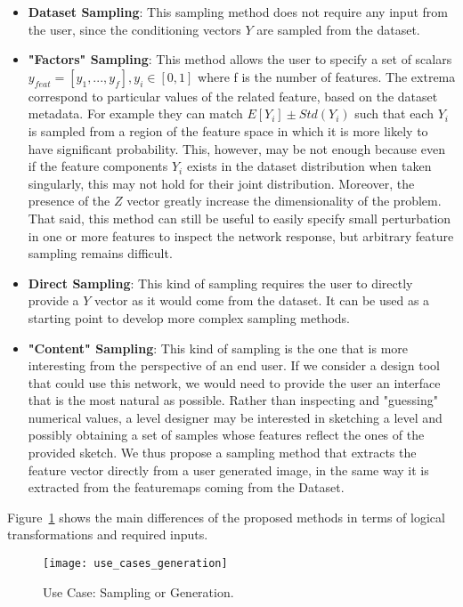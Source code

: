 \begin{itemize}
	\item \textbf{Dataset Sampling}: This sampling method does not require any input from the user, since the conditioning vectors $Y$ are sampled from the dataset.
	\item \textbf{"Factors" Sampling}: This method allows the user to specify a set of scalars $y_{feat} = [y_1, ..., y_f] , y_i \in [0,1]$ where f is the number of features. The extrema correspond to particular values of the related feature, based on the dataset metadata. For example they can match $E[Y_{i}] \pm Std(Y_{i})$ such that each $Y_{i}$ is sampled from a region of the feature space in which it is more likely to have significant probability. This, however, may be not enough because even if the feature components $Y_{i}$ exists in the dataset distribution when taken singularly, this may not hold for their joint distribution. Moreover, the presence of the $Z$ vector greatly increase the dimensionality of the problem. That said, this method can still be useful to easily specify small perturbation in one or more features to inspect the network response, but arbitrary feature sampling remains difficult.
	\item \textbf{Direct Sampling}: This kind of sampling requires the user to directly provide a $Y$ vector as it would come from the dataset. It can be used as a starting point to develop more complex sampling methods.
	\item \textbf{"Content" Sampling}: This kind of sampling is the one that is more interesting from the perspective of an end user. If we consider a design tool that could use this network, we would need to provide the user an interface that is the most natural as possible. Rather than inspecting and "guessing" numerical values, a level designer may be interested in sketching a level and possibly obtaining a set of samples whose features reflect the ones of the provided sketch. We thus propose a sampling method that extracts the feature vector directly from a user generated image, in the same way it is extracted from the \glspl{featuremap} coming from the Dataset.
\end{itemize}
Figure~\ref{fig:usecase_sampling} shows the main differences of the proposed methods in terms of logical transformations and required inputs.

\begin{figure}[h!]
	\begin{center}
		\texttt{[image: use\_cases\_generation]}
	\end{center}
	
	\captionsetup{width=\linewidth}
	\caption[Use Case: Sampling or Generation]{Use Case: Sampling or Generation.}
	\label{fig:usecase_sampling}
\end{figure}


